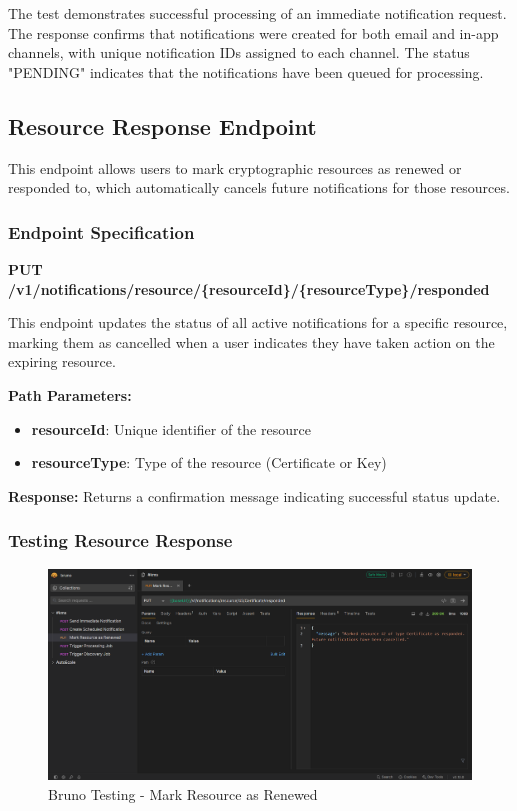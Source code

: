 The test demonstrates successful processing of an immediate notification request. The response confirms that notifications were created for both email and in-app channels, with unique notification IDs assigned to each channel. The status "PENDING" indicates that the notifications have been queued for processing.

\subsection{Resource Response Endpoint}

This endpoint allows users to mark cryptographic resources as renewed or responded to, which automatically cancels future notifications for those resources.

\subsubsection{Endpoint Specification}

\textbf{PUT /v1/notifications/resource/\{resourceId\}/\{resourceType\}/responded}

This endpoint updates the status of all active notifications for a specific resource, marking them as cancelled when a user indicates they have taken action on the expiring resource.

\noindent
\textbf{Path Parameters:}
\begin{itemize}
    \item \textbf{resourceId}: Unique identifier of the resource
    \item \textbf{resourceType}: Type of the resource (Certificate or Key)
\end{itemize}

\noindent
\textbf{Response:} Returns a confirmation message indicating successful status update.

\subsubsection{Testing Resource Response}

\begin{figure}[H]
    \centering
    \includegraphics[width=1\textwidth]{images/bruno_resource_response.png}
    \caption{Bruno Testing - Mark Resource as Renewed}
    \label{fig:bruno_resource_response}
\end{figure}

